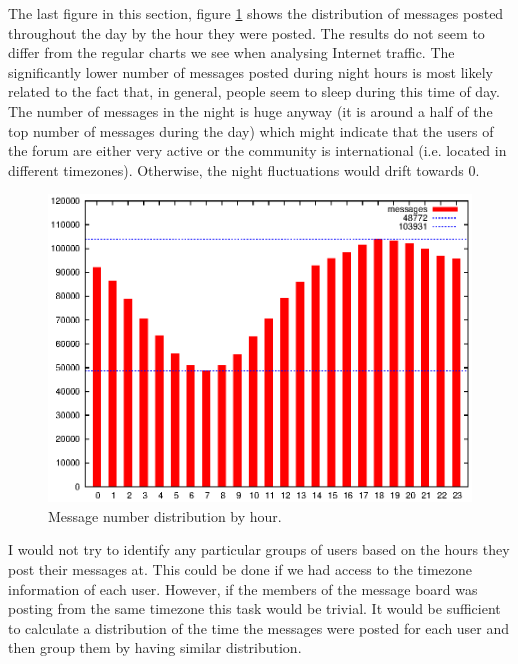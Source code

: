     The last figure in this section, figure \ref{fig:dist_hour} shows the distribution of messages posted throughout the day by the hour they were posted. The results do not seem to differ from the regular charts we see when analysing Internet traffic\cite{GebertPries2012}. The significantly lower number of messages posted during night hours is most likely related to the fact that, in general, people seem to sleep during this time of day\cite{Carskadon2002}. The number of messages in the night is huge anyway (it is around a half of the top number of messages during the day) which might indicate that the users of the forum are either very active or the community is international (i.e. located in different timezones). Otherwise, the night fluctuations would drift towards 0.
    \begin{figure}[H]
      \includegraphics[width=\textwidth]{chapters/03_implementation/hourly}
      \caption{Message number distribution by hour.}
      \label{fig:dist_hour}
    \end{figure}
    I would not try to identify any particular groups of users based on the hours they post their messages at. This could be done if we had access to the timezone information of each user. However, if the members of the message board was posting from the same timezone this task would be trivial. It would be sufficient to calculate a distribution of the time the messages were posted for each user and then group them by having similar distribution.
